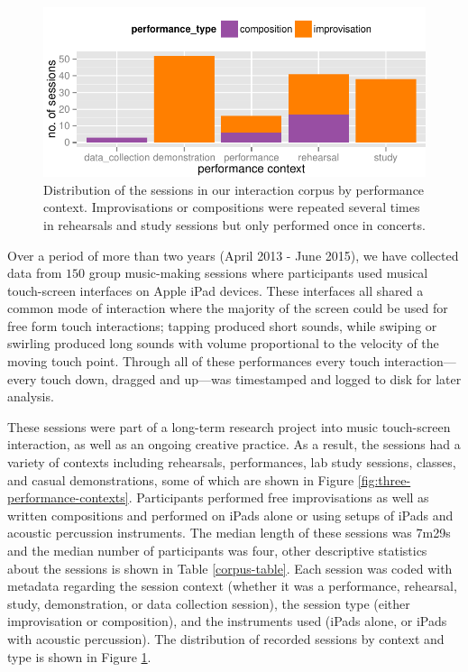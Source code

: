 \documentclass{sigchi}
\begin{document}
\begin{figure}
  \centering
  \includegraphics[width=\linewidth]{figures/sessions-count}
  \caption{Distribution of the sessions in our interaction corpus by
    performance context. Improvisations or compositions were repeated
    several times in rehearsals and study sessions but only performed
    once in concerts.
    \label{fig:count-data}}
\end{figure}



Over a period of more than two years (April 2013 - June 2015), we have
collected data from $150$ group music-making sessions where
participants used musical touch-screen interfaces on Apple iPad
devices. These interfaces all shared a common mode of interaction
where the majority of the screen could be used for free form touch
interactions; tapping produced short sounds, while swiping or swirling
produced long sounds with volume proportional to the velocity of the
moving touch point. Through all of these performances every touch
interaction---every touch down, dragged and up---was timestamped and
logged to disk for later analysis.

These sessions were part of a long-term research project into music
touch-screen interaction, as well as an ongoing creative practice. As
a result, the sessions had a variety of contexts including rehearsals,
performances, lab study sessions, classes, and casual demonstrations,
some of which are shown in Figure
\ref{fig:three-performance-contexts}. Participants performed free
improvisations as well as written compositions and performed on iPads
alone or using setups of iPads and acoustic percussion instruments.
The median length of these sessions was 7m29s and the median number of
participants was four, other descriptive statistics about the sessions
is shown in Table \ref{corpus-table}. Each session was coded with
metadata regarding the session context (whether it was a performance,
rehearsal, study, demonstration, or data collection session), the
session type (either improvisation or composition), and the
instruments used (iPads alone, or iPads with acoustic percussion). The
distribution of recorded sessions by context and type is shown in
Figure \ref{fig:count-data}.
\end{document}
